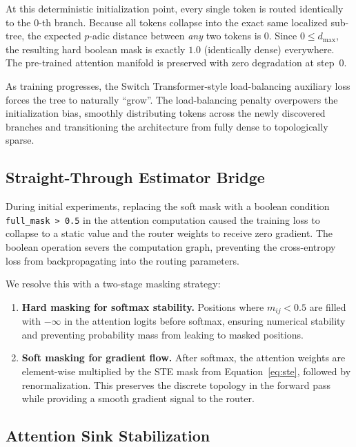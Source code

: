 \documentclass[11pt,a4paper]{article}
\begin{document}
At this deterministic initialization point, every single token is routed identically to the 0-th branch. Because all tokens collapse into the exact same localized sub-tree, the expected $p$-adic distance between \emph{any} two tokens is $0$. Since $0 \le d_{\max}$, the resulting hard boolean mask is exactly $1.0$ (identically dense) everywhere. The pre-trained attention manifold is preserved with zero degradation at step~0.

As training progresses, the Switch Transformer-style load-balancing auxiliary loss forces the tree to naturally ``grow''. The load-balancing penalty overpowers the initialization bias, smoothly distributing tokens across the newly discovered branches and transitioning the architecture from fully dense to topologically sparse.

\subsection{Straight-Through Estimator Bridge}
\label{sec:ste}

During initial experiments, replacing the soft mask with a boolean condition \texttt{full\_mask > 0.5} in the attention computation caused the training loss to collapse to a static value and the router weights to receive zero gradient. The boolean operation severs the computation graph, preventing the cross-entropy loss from backpropagating into the routing parameters.

We resolve this with a two-stage masking strategy:
\begin{enumerate}
    \item \textbf{Hard masking for softmax stability.} Positions where $m_{ij} < 0.5$ are filled with $-\infty$ in the attention logits before softmax, ensuring numerical stability and preventing probability mass from leaking to masked positions.
    \item \textbf{Soft masking for gradient flow.} After softmax, the attention weights are element-wise multiplied by the STE mask from Equation~\ref{eq:ste}, followed by renormalization. This preserves the discrete topology in the forward pass while providing a smooth gradient signal to the router.
\end{enumerate}

\subsection{Attention Sink Stabilization}
\label{sec:sink}
\end{document}
